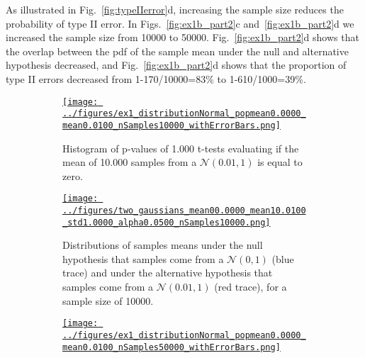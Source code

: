 \documentclass[12pt]{article}
\def\fig_width{3.5in}
\begin{document}
\begin{enumerate}[(a)]
        As illustrated in Fig.~\ref{fig:typeIIerror}d, increasing the sample
        size reduces the probability of type II error. In
        Figs.~\ref{fig:ex1b_part2}c and~\ref{fig:ex1b_part2}d we increased the
        sample size from 10000 to 50000.  Fig.~\ref{fig:ex1b_part2}d shows that
        the overlap between the pdf of the sample mean under the null and
        alternative hypothesis decreased, and Fig.~\ref{fig:ex1b_part2}d shows
        that the proportion of type II errors decreased from 1-170/10000=83\%
        to 1-610/1000=39\%.

        \begin{figure}[H]
            \begin{center}
                \begin{subfigure}{0.4\textwidth}
                    \centering
                    \href{https://www.gatsby.ucl.ac.uk/~rapela/neuroinformatics/2023/ws1/figures/ex1_distributionNormal_popmean0.0000_mean0.0100_nSamples10000_withErrorBars.html}{\texttt{[image: ../figures/ex1\_distributionNormal\_popmean0.0000\_mean0.0100\_nSamples10000\_withErrorBars.png]}}
                    \caption{Histogram of p-values of 1.000 t-tests evaluating if the mean
                    of 10.000 samples from a $\mathcal{N}(0.01, 1)$ is equal to zero.}
                    \label{fig:ex1b_part2_a}
                \end{subfigure}
                \hfill
                \begin{subfigure}{0.4\textwidth}
                    \centering
                    \href{https://www.gatsby.ucl.ac.uk/~rapela/neuroinformatics/2023/ws1/figures/two_gaussians_mean00.0000_mean10.0100_std1.0000_alpha0.0500_nSamples10000.html}{\texttt{[image: ../figures/two\_gaussians\_mean00.0000\_mean10.0100\_std1.0000\_alpha0.0500\_nSamples10000.png]}}
                    \caption{Distributions of samples means under the null
                    hypothesis that samples come from a $\mathcal{N}(0, 1)$
                    (blue trace) and under the alternative hypothesis that
                    samples come from a $\mathcal{N}(0.01, 1)$ (red trace), for
                    a sample size of 10000.}
                    \label{fig:ex1b_part2_b}
                \end{subfigure}
                \begin{subfigure}{0.4\textwidth}
                    \centering
                    \href{https://www.gatsby.ucl.ac.uk/~rapela/neuroinformatics/2023/ws1/figures/ex1_distributionNormal_popmean0.0000_mean0.0100_nSamples50000_withErrorBars.html}{\texttt{[image: ../figures/ex1\_distributionNormal\_popmean0.0000\_mean0.0100\_nSamples50000\_withErrorBars.png]}}

\end{subfigure}
\end{center}
\end{figure}
\end{enumerate}
\end{document}
